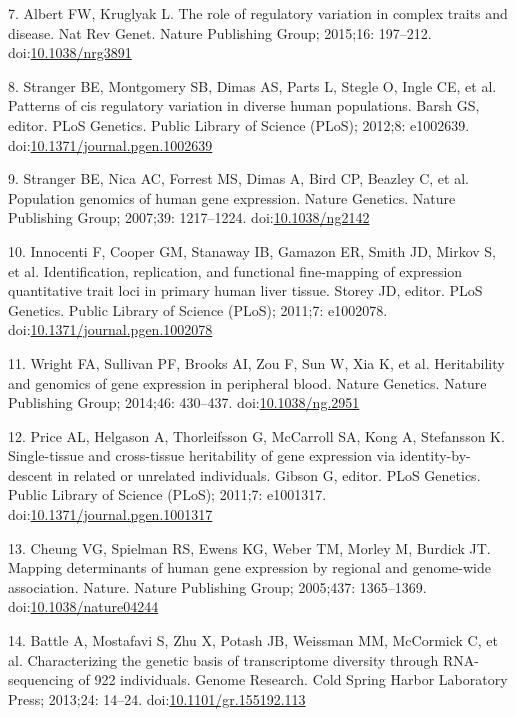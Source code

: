 \documentclass[]{article}
\begin{document}
7. Albert FW, Kruglyak L. The role of regulatory variation in complex
traits and disease. Nat Rev Genet. Nature Publishing Group; 2015;16:
197--212. doi:\href{http://dx.doi.org/10.1038/nrg3891}{10.1038/nrg3891}

8. Stranger BE, Montgomery SB, Dimas AS, Parts L, Stegle O, Ingle CE, et
al. Patterns of cis regulatory variation in diverse human populations.
Barsh GS, editor. PLoS Genetics. Public Library of Science (PLoS);
2012;8: e1002639.
doi:\href{http://dx.doi.org/10.1371/journal.pgen.1002639}{10.1371/journal.pgen.1002639}

9. Stranger BE, Nica AC, Forrest MS, Dimas A, Bird CP, Beazley C, et al.
Population genomics of human gene expression. Nature Genetics. Nature
Publishing Group; 2007;39: 1217--1224.
doi:\href{http://dx.doi.org/10.1038/ng2142}{10.1038/ng2142}

10. Innocenti F, Cooper GM, Stanaway IB, Gamazon ER, Smith JD, Mirkov S,
et al. Identification, replication, and functional fine-mapping of
expression quantitative trait loci in primary human liver tissue. Storey
JD, editor. PLoS Genetics. Public Library of Science (PLoS); 2011;7:
e1002078.
doi:\href{http://dx.doi.org/10.1371/journal.pgen.1002078}{10.1371/journal.pgen.1002078}

11. Wright FA, Sullivan PF, Brooks AI, Zou F, Sun W, Xia K, et al.
Heritability and genomics of gene expression in peripheral blood. Nature
Genetics. Nature Publishing Group; 2014;46: 430--437.
doi:\href{http://dx.doi.org/10.1038/ng.2951}{10.1038/ng.2951}

12. Price AL, Helgason A, Thorleifsson G, McCarroll SA, Kong A,
Stefansson K. Single-tissue and cross-tissue heritability of gene
expression via identity-by-descent in related or unrelated individuals.
Gibson G, editor. PLoS Genetics. Public Library of Science (PLoS);
2011;7: e1001317.
doi:\href{http://dx.doi.org/10.1371/journal.pgen.1001317}{10.1371/journal.pgen.1001317}

13. Cheung VG, Spielman RS, Ewens KG, Weber TM, Morley M, Burdick JT.
Mapping determinants of human gene expression by regional and
genome-wide association. Nature. Nature Publishing Group; 2005;437:
1365--1369.
doi:\href{http://dx.doi.org/10.1038/nature04244}{10.1038/nature04244}

14. Battle A, Mostafavi S, Zhu X, Potash JB, Weissman MM, McCormick C,
et al. Characterizing the genetic basis of transcriptome diversity
through RNA-sequencing of 922 individuals. Genome Research. Cold Spring
Harbor Laboratory Press; 2013;24: 14--24.
doi:\href{http://dx.doi.org/10.1101/gr.155192.113}{10.1101/gr.155192.113}
\end{document}
